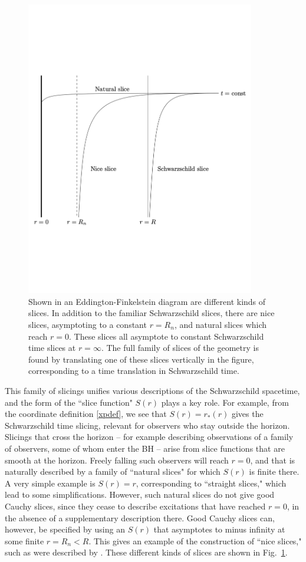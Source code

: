 \documentclass[11pt]{article}
\numberwithin{equation}{section}
\begin{document}
\begin{figure}[!hbtp] \begin{center}
\includegraphics[width=10cm]{fig1.pdf}
\end{center}
\caption{Shown in an Eddington-Finkelstein diagram are different kinds of slices. In addition to the familiar Schwarzschild slices, there are nice slices, asymptoting to a constant $r=R_n$, and natural slices which reach $r=0$.  These slices all asymptote to constant Schwarzschild time slices at $r=\infty$.  The full family of slices of the geometry is found by translating one of these slices vertically in the figure, corresponding to a time translation in Schwarzschild time.}
\label{Figslices}
\end{figure} 



This family of slicings unifies various descriptions of the Schwarzschild spacetime, and the form of the ``slice function" $S(r)$ plays a key role.  For example, from the coordinate definition \eqref{xpdef}, we see that $S(r)=r_*(r)$ gives the Schwarzschild time slicing, relevant for observers who stay outside the horizon.  Slicings that cross the horizon -- for example describing observations of a family of observers, some of whom enter the BH -- arise from slice functions that are smooth at the horizon.  Freely falling such observers will reach $r=0$, and that is naturally described by a family of ``natural slices" for which $S(r)$ is finite there.  A very simple example is $S(r)=r$, corresponding to ``straight slices,"  which lead to some simplifications.  However, such natural slices do not give good Cauchy slices, since they cease to describe excitations that have reached $r=0$, in the absence of a supplementary description there.  Good Cauchy slices can, however, be specified by using an $S(r)$ that asymptotes to minus infinity at some finite $r=R_n<R$.  This gives an example of the construction of ``nice slices," such as were described by \cite{Waldnice,LPSTU}.  These different kinds of slices are shown in Fig.~\ref{Figslices}.
\end{document}
